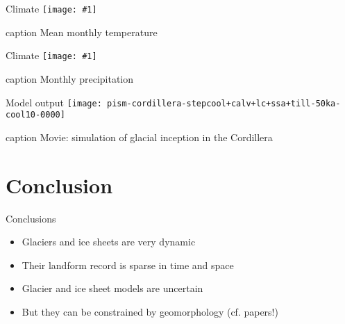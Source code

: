 \documentclass{beamer}
\newcommand{\captionbox}[1]{%
	\begin{beamercolorbox}[ht=2.5ex,dp=1ex,center]{caption}%
		#1%
	\end{beamercolorbox}}
\newcommand{\figurebox}[2]{%
	\centering%
	\texttt{[image: \#1]}\\%
	\captionbox{#2}}
\begin{document}
\begin{frame}{Climate}
	\figurebox{cordillera-narr-10km-artm}{Mean monthly temperature}
\end{frame}

\begin{frame}{Climate}
	\figurebox{cordillera-narr-10km-precip}{Monthly precipitation}
\end{frame}


\begin{frame}{Model output}
	\texttt{[image: pism-cordillera-stepcool+calv+lc+ssa+till-50ka-cool10-0000]}\\
	\captionbox{Movie: simulation of glacial inception in the Cordillera}
\end{frame}


\section*{Conclusion}

\begin{frame}{Conclusions}
	\begin{itemize}
		\item Glaciers and ice sheets are very dynamic
		\item Their landform record is sparse in time and space
		\item Glacier and ice sheet models are uncertain
		\item But they can be constrained by geomorphology (cf. papers!)
	\end{itemize}
\end{frame}
\end{document}
